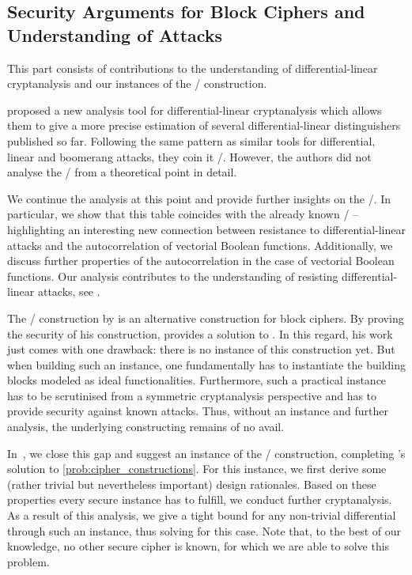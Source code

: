\subsection{Security Arguments for Block Ciphers and Understanding of Attacks}
This part consists of contributions to the understanding of differential-linear cryptanalysis and our instances of the \WSNs/ construction.

\textcite{EC:BDKW19} proposed a new analysis tool for differential-linear cryptanalysis which allows them to give a more precise estimation of several differential-linear distinguishers published so far.
Following the same pattern as similar tools for differential, linear and boomerang attacks, they coin it \DLCT/.
However, the authors did not analyse the \DLCT/ from a theoretical point in detail.

We continue the analysis at this point and provide further insights on the \DLCT/.
In particular, we show that this table coincides with the already known \ACT/ -- highlighting an interesting new connection between resistance to differential-linear attacks and the autocorrelation of vectorial Boolean functions.
Additionally, we discuss further properties of the autocorrelation in the case of vectorial Boolean functions.
Our analysis contributes to the understanding of resisting differential-linear attacks, see .

The \WSN/ construction by \textcite{AC:Tessaro15} is an alternative construction for block ciphers.
By proving the security of his construction, \citeauthor{AC:Tessaro15} provides a solution to .
In this regard, his work just comes with one drawback: there is no instance of this construction yet.
But when building such an instance, one fundamentally has to instantiate the building blocks modeled as ideal functionalities.
Furthermore, such a practical instance has to be scrutinised from a symmetric cryptanalysis perspective and has to provide security against known attacks.
Thus, without an instance and further analysis, the underlying constructing remains of no avail.

In~\cite{EC:CLLNW19}, we close this gap and suggest an instance of the \WSN/ construction, completing \citeauthor{AC:Tessaro15}'s solution to \cref{prob:cipher_constructions}.
For this instance, we first derive some (rather trivial but nevertheless important) design rationales.
Based on these properties every secure instance has to fulfill, we conduct further cryptanalysis.
As a result of this analysis, we give a tight bound for any non-trivial differential through such an instance, thus solving  for this case.
Note that, to the best of our knowledge, no other secure cipher is known, for which we are able to solve this problem.

